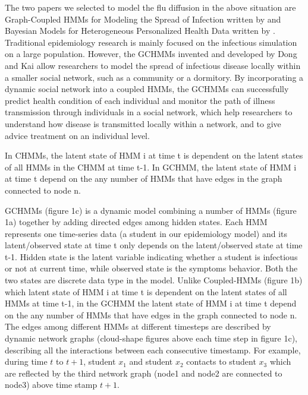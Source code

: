 \documentclass{article} %
\begin{document}
The two papers we selected to model the flu diffusion in the above situation are Graph-Coupled HMMs for Modeling the Spread of Infection written by \cite{dong2012graph} and Bayesian Models for Heterogeneous Personalized Health Data written by \cite{fan2015bayesian}. Traditional epidemiology research is mainly focused on the infectious simulation on a large population. However, the GCHMMs invented and developed by Dong and Kai allow researchers to model the spread of infectious disease locally within a smaller social network, such as a community or a dormitory. By incorporating a dynamic social network into a coupled HMMs, the GCHMMs can successfully predict health condition of each individual and monitor the path of illness transmission through individuals in a social network, which help researchers to understand how disease is transmitted locally within a network, and to give advice treatment on an individual level.

In CHMMs, the latent state of HMM i at time t is dependent on the latent states of all HMMs in the CHMM at time t-1. In GCHMM, the latent state of HMM i at time t depend on the any number of HMMs that have edges in the graph connected to node n.

GCHMMs (figure 1c) is a dynamic model combining a number of HMMs (figure 1a) together by adding directed edges among hidden states. Each HMM represents one time-series data (a student in our epidemiology model) and its latent/observed  state at time t only depends on the latent/observed state at time t-1. Hidden state is the latent variable indicating whether a student is infectious or not at current time, while observed state is the symptoms behavior. Both the two states are discrete data type in the model. Unlike Coupled-HMMs (figure 1b) which latent state of HMM i at time t is dependent on the latent states of all HMMs at time t-1, in the GCHMM the latent state of HMM i at time t depend on the any number of HMMs that have edges in the graph connected to node n. The edges among different HMMs at different timesteps are described by dynamic network graphs (cloud-shape figures above each time step in figure 1c), describing all the interactions between each consecutive timestamp. For example, during time $t$ to $t+1$, student $x_1$ and student $x_2$ contacts to student $x_3$ which are reflected by the third network graph (node1 and node2 are connected to node3) above time stamp $t+1$.
\end{document}
